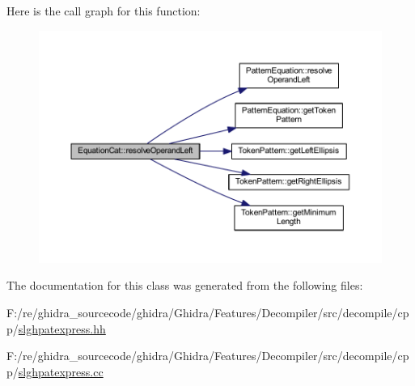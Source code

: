 Here is the call graph for this function\+:
\nopagebreak
\begin{figure}[H]
\begin{center}
\leavevmode
\includegraphics[width=350pt]{class_equation_cat_a1c2557c53605b96ab6888ea55d8f5964_cgraph}
\end{center}
\end{figure}


The documentation for this class was generated from the following files\+:\begin{DoxyCompactItemize}
\item 
F\+:/re/ghidra\+\_\+sourcecode/ghidra/\+Ghidra/\+Features/\+Decompiler/src/decompile/cpp/\mbox{\hyperlink{slghpatexpress_8hh}{slghpatexpress.\+hh}}\item 
F\+:/re/ghidra\+\_\+sourcecode/ghidra/\+Ghidra/\+Features/\+Decompiler/src/decompile/cpp/\mbox{\hyperlink{slghpatexpress_8cc}{slghpatexpress.\+cc}}\end{DoxyCompactItemize}
